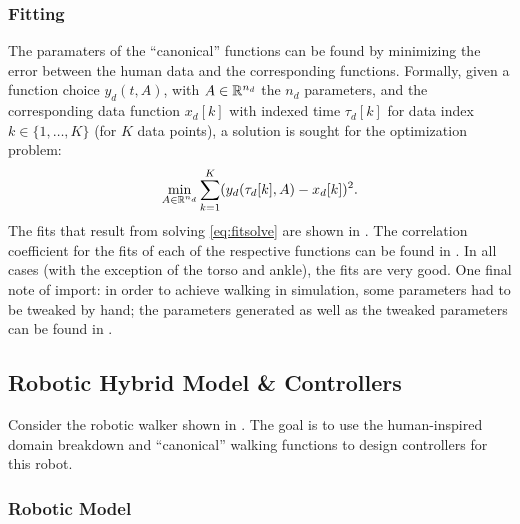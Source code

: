 \subsubsection{Fitting}
The paramaters of the ``canonical'' functions can be found by minimizing the
error between the human data and the corresponding functions.
%
Formally, given a function choice $y_d(t, A)$, with $A \in \mathbb{R}^{n_{d}}$ the $n_d$
parameters, and the corresponding data function $x_{d}[k]$ with indexed time
$\tau_{d}[k]$ for data index $k \in \{1, \ldots, K\}$ (for $K$ data points), a
solution is sought for the optimization problem:
%
\begin{align}
  \label{eq:fitsolve}
  \min_{A \in \mathbb{R}^{n_{d}}} \sum_{k=1}^{K} (y_{d}(\tau_{d}[k], A) - x_{d}[k])^2.
\end{align}
%
The fits that result from solving \eqref{eq:fitsolve} are shown in
.
%
The correlation coefficient for the fits of each of the respective functions can
be found in .
%
In all cases (with the exception of the torso and ankle), the fits are very
good.
%
One final note of import:
%
in order to achieve walking in simulation, some parameters had to be tweaked by
hand;
%
the parameters generated as well as the tweaked parameters can be found in
.




\subsection{Robotic Hybrid Model \& Controllers}

Consider the robotic walker shown in . The goal is to use the human-inspired domain breakdown and ``canonical'' walking functions to design controllers for this robot.

\subsubsection{Robotic Model}

